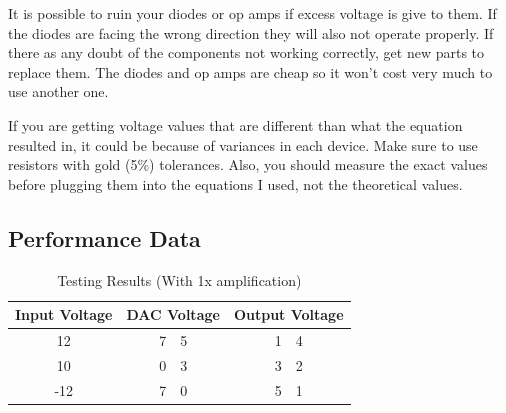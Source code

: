 It is possible to ruin your diodes or op amps if excess voltage is give to them.
If the diodes are facing the wrong direction they will also not operate 
properly. If there as any doubt of the components not working correctly, get 
new parts to replace them. The diodes and op amps are cheap so it won't cost 
very much to use another one.

If you are getting voltage values that are different than what the equation 
resulted in, it could be because of variances in each device. Make sure to use 
resistors with gold (5\%) tolerances. Also, you should measure the exact values
 before plugging them into the equations I used, not the theoretical values.

\subsection{Performance Data}
\begin{table}[hbp]
\caption[Test Results]{Testing Results (With 1x amplification)}
\begin{center}
\begin{tabular}{c| r @{.} l r @{.} l}  
	Input Voltage & \multicolumn{2}{r}{DAC Voltage} &
	\multicolumn{2}{r}{Output Voltage} \\ \hline
	12 & 7 & 5 & 1 & 4 \\ \hline
	10 & 0 & 3 & 3 & 2 \\ \hline
	-12 & 7 & 0 & 5 & 1 \\
\end{tabular}
\end{center}
\label{tab:analog input data}
\end{table}
